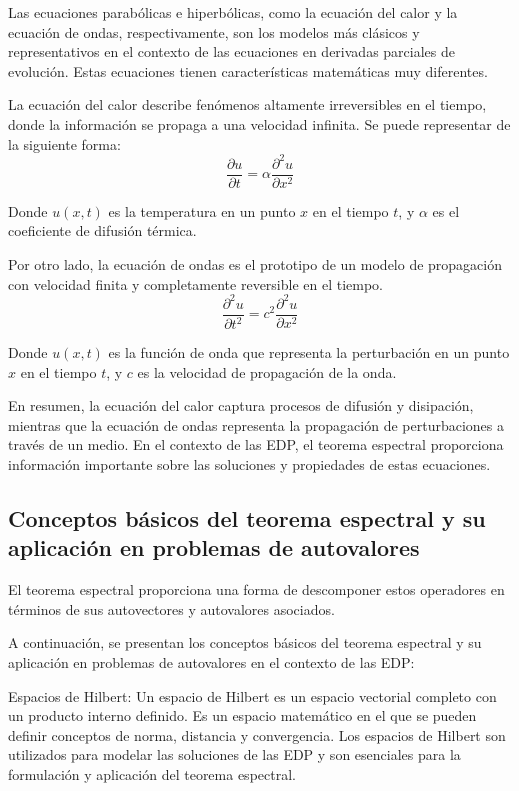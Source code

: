 \documentclass{article}
\begin{document}
    Las ecuaciones parabólicas e hiperbólicas, como la ecuación del calor y la ecuación de ondas, respectivamente, son los modelos más clásicos y representativos en el contexto de las ecuaciones en derivadas parciales de evolución. Estas ecuaciones tienen características matemáticas muy diferentes. 

    La ecuación del calor describe fenómenos altamente irreversibles en el tiempo, donde la información se propaga a una velocidad infinita. Se puede representar de la siguiente forma:
    \begin{equation}
        \frac{\partial u}{\partial t} = \alpha \frac{\partial^2 u}{\partial x^2}
        \end{equation}
    
    Donde $u(x,t)$ es la temperatura en un punto $x$ en el tiempo $t$, y $\alpha$ es el coeficiente de difusión térmica.

    Por otro lado, la ecuación de ondas es el prototipo de un modelo de propagación con velocidad finita y completamente reversible en el tiempo.
    \begin{equation}
        \frac{\partial^2 u}{\partial t^2} = c^2 \frac{\partial^2 u}{\partial x^2}
        \end{equation}
        
        Donde $u(x,t)$ es la función de onda que representa la perturbación en un punto $x$ en el tiempo $t$, y $c$ es la velocidad de propagación de la onda.



    En resumen, la ecuación del calor captura procesos de difusión y disipación, mientras que la ecuación de ondas representa la propagación de perturbaciones a través de un medio. En el contexto de las EDP, el teorema espectral proporciona información importante sobre las soluciones y propiedades de estas ecuaciones.
    \subsection{Conceptos básicos del teorema espectral y su aplicación en problemas de autovalores}

    El teorema espectral proporciona una forma de descomponer estos operadores en términos de sus autovectores y autovalores asociados.

    A continuación, se presentan los conceptos básicos del teorema espectral y su aplicación en problemas de autovalores en el contexto de las EDP:

    Espacios de Hilbert: Un espacio de Hilbert es un espacio vectorial completo con un producto interno definido. Es un espacio matemático en el que se pueden definir conceptos de norma, distancia y convergencia. Los espacios de Hilbert son utilizados para modelar las soluciones de las EDP y son esenciales para la formulación y aplicación del teorema espectral.
\end{document}
